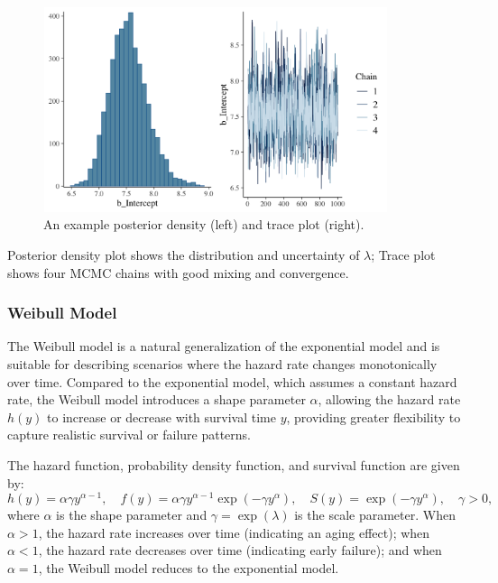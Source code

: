 \begin{figure}[H]
    \centering
    \includegraphics[height=6cm, width=0.9\textwidth]{MSc_Statistics_Research_Report_paper/images/exp model veteran.png}
    \caption{An example posterior density (left) and trace plot (right).}
    \label{fig:exp veteran}
\end{figure}
Posterior density plot shows the distribution and uncertainty of $\lambda$; Trace plot shows four MCMC chains with good mixing and convergence.








\subsubsection{Weibull Model} \label{Weibull Model}
The Weibull model is a natural generalization of the exponential model and is suitable for describing scenarios where the hazard rate changes monotonically over time. Compared to the exponential model, which assumes a constant hazard rate, the Weibull model introduces a shape parameter $\alpha$, allowing the hazard rate $h(y)$ to increase or decrease with survival time $y$, providing greater flexibility to capture realistic survival or failure patterns.

The hazard function, probability density function, and survival function are given by:
$$
h(y) = \alpha \gamma y^{\alpha - 1}, 
\quad 
f(y) = \alpha \gamma y^{\alpha - 1} \exp(-\gamma y^{\alpha}), 
\quad 
S(y) = \exp(-\gamma y^{\alpha}),
\quad \gamma > 0,
$$
where $\alpha$ is the shape parameter and $\gamma = \exp(\lambda)$ is the scale parameter. When $\alpha > 1$, the hazard rate increases over time (indicating an aging effect); when $\alpha < 1$, the hazard rate decreases over time (indicating early failure); and when $\alpha = 1$, the Weibull model reduces to the exponential model.

